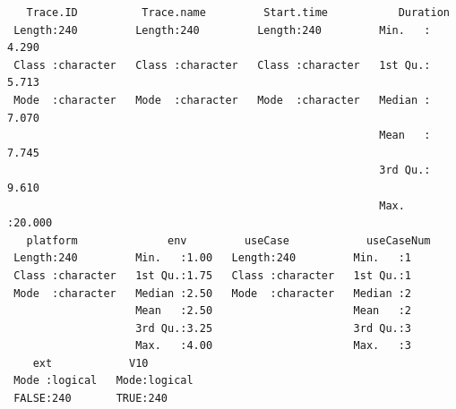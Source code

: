\documentclass[
  letterpaper,
  DIV=11,
  numbers=noendperiod]{scrartcl}
\newenvironment{Shaded}{\begin{snugshade}}{\end{snugshade}}
\newcommand{\CommentTok}[1]{\textcolor[rgb]{0.37,0.37,0.37}{#1}}
\newcommand{\DecValTok}[1]{\textcolor[rgb]{0.68,0.00,0.00}{#1}}
\newcommand{\FunctionTok}[1]{\textcolor[rgb]{0.28,0.35,0.67}{#1}}
\newcommand{\NormalTok}[1]{\textcolor[rgb]{0.00,0.23,0.31}{#1}}
\newcommand{\OtherTok}[1]{\textcolor[rgb]{0.00,0.23,0.31}{#1}}
\newcommand{\SpecialCharTok}[1]{\textcolor[rgb]{0.37,0.37,0.37}{#1}}
\begin{document}
\begin{Shaded}
\end{Shaded}

\begin{Shaded}
\end{Shaded}

\begin{verbatim}
   Trace.ID          Trace.name         Start.time           Duration     
 Length:240         Length:240         Length:240         Min.   : 4.290  
 Class :character   Class :character   Class :character   1st Qu.: 5.713  
 Mode  :character   Mode  :character   Mode  :character   Median : 7.070  
                                                          Mean   : 7.745  
                                                          3rd Qu.: 9.610  
                                                          Max.   :20.000  
   platform              env         useCase            useCaseNum
 Length:240         Min.   :1.00   Length:240         Min.   :1   
 Class :character   1st Qu.:1.75   Class :character   1st Qu.:1   
 Mode  :character   Median :2.50   Mode  :character   Median :2   
                    Mean   :2.50                      Mean   :2   
                    3rd Qu.:3.25                      3rd Qu.:3   
                    Max.   :4.00                      Max.   :3   
    ext            V10         
 Mode :logical   Mode:logical  
 FALSE:240       TRUE:240      
                               
                               
                               
                               
\end{verbatim}
\end{document}
